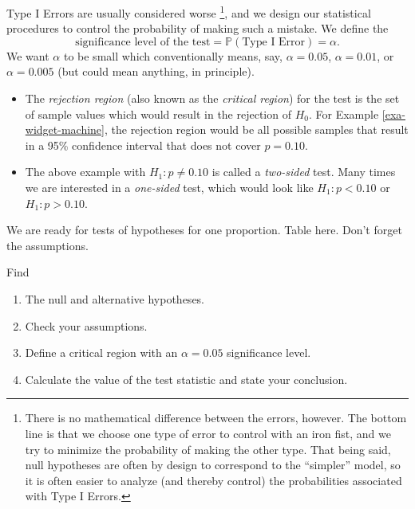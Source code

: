 \documentclass[captions=tableheading]{scrbook}
\begin{document}
Type I Errors are usually considered worse
\footnote{There is no mathematical difference between the errors, however. The bottom line is that we choose one type of error to control with an iron fist, and we try to minimize the probability of making the other type. That being said, null hypotheses are often by design to correspond to the ``simpler'' model, so it is often easier to analyze (and thereby control) the probabilities associated with Type I Errors.}, 
and we design our statistical procedures to control the probability of making such a mistake. We define the
\begin{equation}
\mbox{significance level of the test}=\mathbb{P}(\mbox{Type I Error})=\alpha.
\end{equation}
We want \(\alpha\) to be small which conventionally means, say, \(\alpha=0.05\), \(\alpha=0.01\), or \(\alpha=0.005\) (but could mean anything, in principle).
\begin{itemize}
\item The \emph{rejection region} (also known as the \emph{critical region}) for the test is the set of sample values which would result in the rejection of \(H_{0}\). For Example \ref{exa-widget-machine}, the rejection region would be all possible samples that result in a 95\% confidence interval that does not cover \(p=0.10\).
\item The above example with \(H_{1}:p\neq0.10\) is called a \emph{two-sided} test. Many times we are interested in a \emph{one-sided} test, which would look like \(H_{1}:p<0.10\) or \(H_{1}:p>0.10\).
\end{itemize}

We are ready for tests of hypotheses for one proportion.
Table here.
Don't forget the assumptions.

\begin{example}
Find
\begin{enumerate}
\item The null and alternative hypotheses.
\item Check your assumptions.
\item Define a critical region with an \(\alpha=0.05\) significance level.
\item Calculate the value of the test statistic and state your conclusion.
\end{enumerate}
\end{example}
\end{document}
